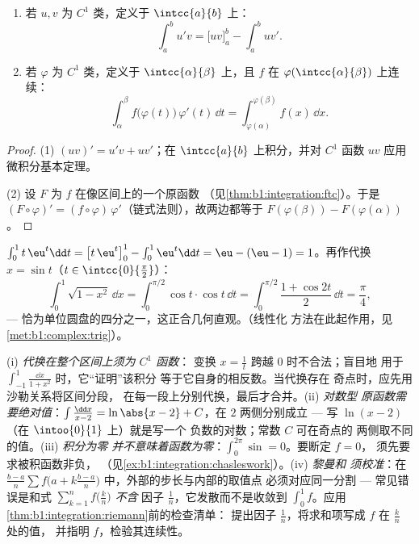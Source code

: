 \begin{theorem}\label{thm:b1:integration:parts}
\begin{enumerate}
  \item 若 $u, v$ 为 $C^1$ 类，定义于 $\intcc{a}{b}$ 上：
        \[
        \int_a^b u'v = \bigl[uv\bigr]_a^b - \int_a^b uv' .
        \]
  \item 若 $\varphi$ 为 $C^1$ 类，定义于 $\intcc{\alpha}{\beta}$ 上，且 $f$
        在 $\varphi(\intcc{\alpha}{\beta})$ 上连续：
        \[
        \int_{\alpha}^{\beta} f\bigl(\varphi(t)\bigr)\,\varphi'(t)\,
        \dd t = \int_{\varphi(\alpha)}^{\varphi(\beta)} f(x)\, \dd x .
        \]
\end{enumerate}
\end{theorem}

\begin{proof}
(1) $(uv)' = u'v + uv'$；在 $\intcc{a}{b}$ 上积分，并对
$C^1$ 函数 $uv$ 应用微积分基本定理。

(2) 设 $F$ 为 $f$ 在像区间上的一个原函数
（见\cref{thm:b1:integration:ftc}）。于是 $(F \circ \varphi)' = (f
\circ \varphi)\,\varphi'$（链式法则），故两边都等于
$F(\varphi(\beta)) - F(\varphi(\alpha))$。
\end{proof}

\begin{example}\label{ex:b1:integration:parts}
$\int_0^1 t\,\eu^t \dd t = \bigl[t\,\eu^t\bigr]_0^1 - \int_0^1
\eu^t\dd t = \eu - (\eu - 1) = 1$。再作代换 $x =
\sin t$（$t \in \intcc{0}{\frac\pi2}$）：
\[
\int_0^1 \sqrt{1 - x^2}\, \dd x
= \int_0^{\pi/2} \cos t \cdot \cos t \, \dd t
= \int_0^{\pi/2} \frac{1 + \cos 2t}{2}\, \dd t = \frac\pi4 ,
\]
--- 恰为单位圆盘的四分之一，这正合几何直观。（线性化
方法在此起作用，见\cref{met:b1:complex:trig}）。
\end{example}

\begin{remark}[积分计算中的常见误区]
(i) \emph{代换在整个区间上须为 $C^1$ 函数}：
变换 $x = \frac1t$ 跨越 $0$ 时不合法；盲目地
用于 $\int_{-1}^{1}\frac{\dd x}{1 + x^2}$ 时，它“证明”该积分
等于它自身的相反数。当代换存在
奇点时，应先用沙勒关系将区间分段，
在每一段上分别代换，最后才合并。(ii) \emph{对数型
原函数需要绝对值}：$\int \frac{\dd x}{x - 2} =
\ln\abs{x - 2} + C$，在 $2$ 两侧分别成立 --- 写 $\ln(x - 2)$
（在 $\intoo{0}{1}$ 上）就是写一个
负数的对数；常数 $C$ 可在奇点的
两侧取不同的值。(iii) \emph{积分为零
并不意味着函数为零}：$\int_0^{2\pi}\sin = 0$。要断定 $f = 0$，
须先要求被积函数非负，
（见\cref{ex:b1:integration:chasleswork}）。(iv) \emph{黎曼和
须校准}：在 $\frac{b-a}{n}\sum f\bigl(a +
k\frac{b-a}{n}\bigr)$ 中，外部的步长与内部的取值点
必须对应同一分割 --- 常见错误是和式
$\sum_{k=1}^{n} f\bigl(\frac kn\bigr)$ \emph{不含}
因子 $\frac1n$，它发散而不是收敛到 $\int_0^1
f$。应用\cref{thm:b1:integration:riemann}前的检查清单：
提出因子 $\frac1n$，将求和项写成 $f$ 在 $\frac kn$ 处的值，
并指明 $f$，检验其连续性。
\end{remark}

